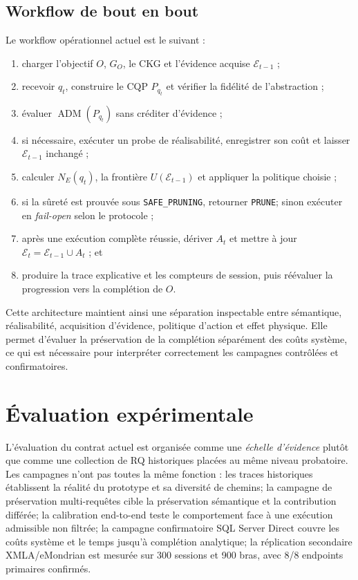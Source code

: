 \documentclass[journal]{IEEEtran}
\begin{document}
\subsection{Workflow de bout en bout}

Le workflow opérationnel actuel est le suivant :
\begin{enumerate}
  \item charger l'objectif $O$, $G_O$, le CKG et l'évidence acquise $\mathcal{E}_{t-1}$ ;
  \item recevoir $q_t$, construire le CQP $P_{q_t}$ et vérifier la fidélité de l'abstraction ;
  \item évaluer $\operatorname{ADM}(P_{q_t})$ sans créditer d'évidence ;
  \item si nécessaire, exécuter un probe de réalisabilité, enregistrer son coût et laisser $\mathcal{E}_{t-1}$ inchangé ;
  \item calculer $N_E(q_t)$, la frontière $U(\mathcal{E}_{t-1})$ et appliquer la politique choisie ;
  \item si la sûreté est prouvée sous \texttt{SAFE\_PRUNING}, retourner \texttt{PRUNE}; sinon exécuter en \emph{fail-open} selon le protocole ;
  \item après une exécution complète réussie, dériver $A_t$ et mettre à jour $\mathcal{E}_t=\mathcal{E}_{t-1}\cup A_t$ ; et
  \item produire la trace explicative et les compteurs de session, puis réévaluer la progression vers la complétion de $O$.
\end{enumerate}

Cette architecture maintient ainsi une séparation inspectable entre sémantique, réalisabilité, acquisition d'évidence, politique d'action et effet physique. Elle permet d'évaluer la préservation de la complétion séparément des coûts système, ce qui est nécessaire pour interpréter correctement les campagnes contrôlées et confirmatoires.


\section{Évaluation expérimentale}
\label{sec:exp}
\label{sec:experiments}

L'évaluation du contrat actuel est organisée comme une \emph{échelle d'évidence} plutôt que comme une collection de RQ historiques placées au même niveau probatoire. Les campagnes n'ont pas toutes la même fonction : les traces historiques établissent la réalité du prototype et sa diversité de chemins; la campagne de préservation multi-requêtes cible la préservation sémantique et la contribution différée; la calibration end-to-end teste le comportement face à une exécution admissible non filtrée; la campagne confirmatoire SQL Server Direct couvre les coûts système et le temps jusqu'à complétion analytique; la réplication secondaire XMLA/eMondrian est mesurée sur 300 sessions et 900 bras, avec 8/8 endpoints primaires confirmés.
\end{document}
